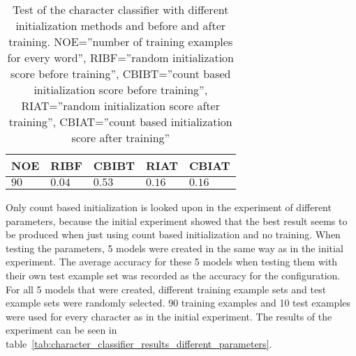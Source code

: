 \begin{table}[htb]
  \begin{center}
  \begin{tabular}{ l l l l l }
    NOE    & RIBF   & CBIBT  & RIAT    & CBIAT \\ \hline
    $90$  & $0.04$ & $0.53$ & $0.16$  & $0.16$  \\   
  \end{tabular}
\end{center}
\caption{Test of the character classifier with different initialization methods and before and after training.
	 NOE=''number of training examples for every word'',
         RIBF=''random initialization score before training'',
         CBIBT=''count based initialization score before training'',
         RIAT=''random initialization score after training'',
         CBIAT=''count based initialization score after training''} 
\label{tab:character_classifier_initial_experiment} 
\end{table}

Only count based initialization is looked upon in the experiment of different parameters, because the initial experiment showed that the best result seems to be produced when just using count based initialization and no training.
When testing the parameters, 5 models were created in the same way as in the initial experiment. 
The average accuracy for these 5 models when testing them with their own test example set was recorded as the accuracy for the configuration. 
For all 5 models that were created, different training example sets and test example sets were randomly selected. 
90 training examples and 10 test examples were used for every character as in the initial experiment. 
The results of the experiment can be seen in table~\ref{tab:character_classifier_results_different_parameters}.

